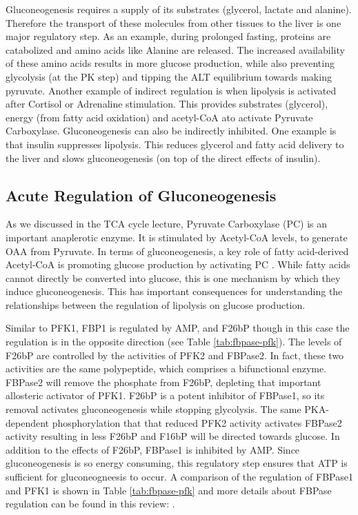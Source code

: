 \documentclass{tufte-handout}
\begin{document}
  Gluconeogenesis requires a supply of its substrates (glycerol, lactate and alanine).  Therefore the transport of these molecules from other tissues to the liver is one major regulatory step.  As an example, during prolonged fasting, proteins are catabolized and amino acids like Alanine are released.  The increased availability of these amino acids results in more glucose production, while also preventing glycolysis (at the PK step) and tipping the ALT equilibrium towards making pyruvate.  Another example of indirect regulation is when lipolysis is activated after Cortisol or Adrenaline stimulation.  This provides substrates (glycerol), energy (from fatty acid oxidation) and acetyl-CoA ato activate Pyruvate Carboxylase.  Gluconeogenesis can also be indirectly inhibited.  One example is that insulin suppresses lipolysis.  This reduces glycerol and fatty acid delivery to the liver and slows gluconeogenesis (on top of the direct effects of insulin).

\subsection{Acute Regulation of Gluconeogenesis}

As we discussed in the TCA cycle lecture, Pyruvate Carboxylase (PC) is an important anaplerotic enzyme.  It is stimulated by Acetyl-CoA levels, to generate OAA from Pyruvate.  In terms of gluconeogenesis, a key role of fatty acid-derived Acetyl-CoA is promoting glucose production by activating PC \citep{Perry2015}.  While fatty acids cannot directly be converted into glucose, this is one mechanism by which they induce gluconeogenesis.  This has important consequences for understanding the relationships between the regulation of lipolysis on glucose production.

  Similar to PFK1, FBP1 is regulated by AMP, and F26bP though in this case the regulation is in the opposite direction (see Table \ref{tab:fbpase-pfk}).  The levels of F26bP are controlled by the activities of PFK2 and FBPase2. In fact, these two activities are the same polypeptide, which comprises a bifunctional enzyme.  FBPase2 will remove the phosphate from F26bP, depleting that important allosteric activator of PFK1.  F26bP is a potent inhibitor of FBPase1, so its removal activates gluconeogenesis while stopping glycolysis. The same PKA-dependent phosphorylation that that reduced PFK2 activity activates FBPase2 activity resulting in less F26bP and F16bP will be directed towards glucose.  In addition to the effects of F26bP, FBPase1 is inhibited by AMP.  Since gluconeogenesis is so energy consuming, this regulatory step ensures that ATP is sufficient for gluconeogneesis to occur.  A comparison of the regulation of FBPase1 and PFK1 is shown in Table \ref{tab:fbpase-pfk} and more details about FBPase regulation can be found in this review: \citet{Okar2001}. 
\end{document}
